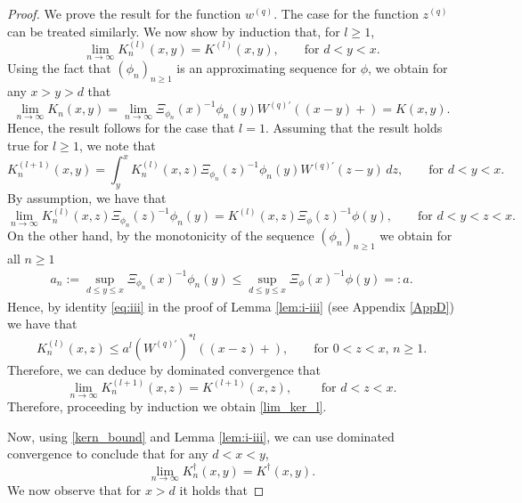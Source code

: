 \documentclass[12pt,reqno]{amsart}
\newcommand{\red}{\textcolor[rgb]{1.00,0.00,0.00}}
\theoremstyle{definition}
\theoremstyle{remark}
\begin{document}
\begin{proof} We prove the result for the function $w^{(q)}$.
The case for the function $z^{(q)}$ can be treated similarly. 
We now show by induction that, for $l \geq 1$,
	\begin{equation}\label{lim_ker_l}
	\lim_{n\to\infty}K_{n}^{(l)}(x,y)= K^{(l)}(x,y),\qquad\text{for $d<y<x$.}
	\end{equation}
Using the fact that $(\phi_n)_{n\geq1}$ is an approximating sequence for $\phi$, we obtain for any $x> y> d$  that
\[
\lim_{n\to\infty}K_n(x,y)=\lim_{n\to\infty} \Xi_{\phi_n}(x)^{-1} \phi_n(y)W^{(q)\prime}((x-y)+)=K(x,y).
\]
Hence, the result follows for the case that $l=1$. Assuming that the result holds true for $l\geq 1$,
we note that
\begin{equation*}
K_{n}^{(l+1)}(x,y)=\int_y^xK_{n}^{(l)}(x,z)\Xi_{\phi_n}(z)^{-1} \phi_n(y){W^{(q)\prime}}(z-y)\,dz,\qquad\text{{for $d<y<x$.}}
\end{equation*}
By assumption, we have that
\begin{equation*}
\lim_{n\to\infty}K_{n}^{(l)}(x,z)\Xi_{\phi_n}(z)^{-1} \phi_n(y)= K^{(l)}(x,z)\Xi_{\phi}(z)^{-1} \phi(y),\qquad\text{{for $d<y<z<x$.}}
\end{equation*}
On the other hand, by the monotonicity of the sequence $(\phi_n)_{n\geq1}$ we obtain for all $n\geq 1$
\begin{align*}
a_n:=\sup_{d\leq y\leq x}\Xi_{\phi_n}(x)^{-1} \phi_n(y)\leq \sup_{d\leq y\leq x}\Xi_{\phi}(x)^{-1} \phi(y)=:a.
\end{align*}
Hence, by  identity \eqref{eq:iii} in the proof of Lemma \ref{lem:i-iii} (see Appendix \ref{AppD}) we have that
\begin{equation}\label{kern_bound}
K_{n}^{(l)}(x,z)\le a^l(W^{(q)\prime})^{*l}((x-z)+),\qquad\text{for $0<z<x$, $n\geq 1$.}
\end{equation}
Therefore, we can deduce by dominated convergence that
\begin{equation*}
\lim_{n\to\infty}K_{n}^{(l+1)}(x,z)= K^{(l+1)}(x,z),\qquad\text{ for $d<z<x$.}
\end{equation*}
Therefore, proceeding by induction we obtain \eqref{lim_ker_l}.	
\par Now, using \eqref{kern_bound} and Lemma \ref{lem:i-iii}, we can use dominated convergence to conclude that for any $d<x<y$,
\begin{equation*}
\lim_{n\to\infty}K_{n}^{\dagger}(x,y)=K^{\dagger}(x,y).
\end{equation*}
We now observe that for $x>d$ it holds that %

\end{proof}
\end{document}
